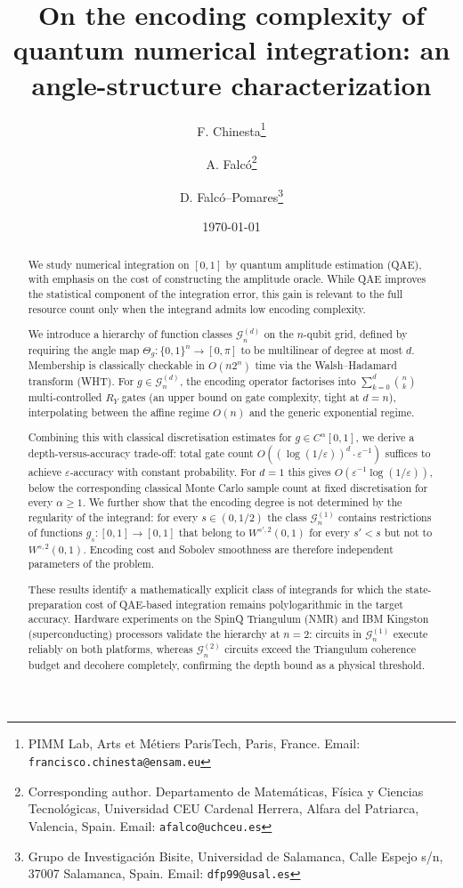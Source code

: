 \documentclass[12pt,a4paper]{article}
\title{%
  \textbf{On the encoding complexity of quantum numerical integration:
  an angle-structure characterization}\\[6pt]
  }
\author{%
  F. Chinesta\thanks{PIMM Lab, Arts et Métiers ParisTech, Paris, France. Email: \texttt{francisco.chinesta@ensam.eu}}
  \and
  A. Falcó\thanks{Corresponding author. Departamento de Matemáticas, Física y Ciencias Tecnológicas, Universidad CEU Cardenal Herrera, 
  Alfara del Patriarca, Valencia, Spain. Email: \texttt{afalco@uchceu.es}}
  \and
  D. Falcó--Pomares\thanks{Grupo de Investigación 
  Bisite, Universidad de Salamanca, Calle Espejo s/n, 37007 Salamanca, Spain. 
  Email: \texttt{dfp99@usal.es}}}
\date{\today}
\theoremstyle{plain}
\theoremstyle{definition}
\theoremstyle{remark}
\begin{document}
\maketitle

\begin{abstract}
We study numerical integration on $[0,1]$ by quantum amplitude
estimation (QAE), with emphasis on the cost of constructing the
amplitude oracle. While QAE improves the statistical component of
the integration error, this gain is relevant to the full resource
count only when the integrand admits low encoding complexity.

We introduce a hierarchy of function classes $\mathcal{G}_n^{(d)}$
on the $n$-qubit grid, defined by requiring the angle map
$\Theta_g : \{0,1\}^n \to [0,\pi]$ to be multilinear of degree at
most $d$. Membership is classically checkable in $O(n2^n)$ time via
the Walsh--Hadamard transform (WHT). For $g \in \mathcal{G}_n^{(d)}$,
the encoding operator factorises into
$\sum_{k=0}^d \binom{n}{k}$ multi-controlled $R_Y$ gates
(an upper bound on gate complexity, tight at $d=n$),
interpolating between the affine regime $O(n)$ and the generic
exponential regime.

Combining this with classical discretisation estimates for
$g \in C^\alpha[0,1]$, we derive a depth-versus-accuracy trade-off:
total gate count $O((\log(1/\varepsilon))^d \cdot \varepsilon^{-1})$
suffices to achieve $\varepsilon$-accuracy with constant probability.
For $d=1$ this gives $O(\varepsilon^{-1}\log(1/\varepsilon))$,
below the corresponding classical Monte Carlo sample count at fixed
discretisation for every $\alpha \ge 1$.
We further show that the encoding degree is not determined by the
regularity of the integrand: for every $s \in (0,1/2)$ the class
$\mathcal{G}_n^{(1)}$ contains restrictions of functions
$g_s : [0,1] \to [0,1]$ that belong to $W^{s',2}(0,1)$ for every
$s' < s$ but not to $W^{s,2}(0,1)$.
Encoding cost and Sobolev smoothness are therefore independent
parameters of the problem.

These results identify a mathematically explicit class of integrands
for which the state-preparation cost of QAE-based integration remains
polylogarithmic in the target accuracy.
Hardware experiments on the SpinQ Triangulum (NMR) and IBM Kingston
(superconducting) processors validate the hierarchy at $n=2$:
circuits in $\mathcal{G}_n^{(1)}$ execute reliably on both platforms,
whereas $\mathcal{G}_n^{(2)}$ circuits exceed the Triangulum coherence
budget and decohere completely, confirming the depth bound as a
physical threshold.
\end{abstract}
\end{document}
